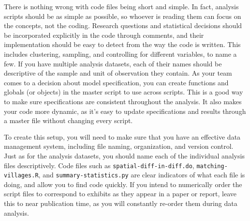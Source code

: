 \documentclass[
]{book}
\begin{document}
There is nothing wrong with code files being short and simple.
In fact, analysis scripts should be as simple as possible,
so whoever is reading them can focus on the concepts, not the coding.
Research questions and statistical decisions should be incorporated explicitly in the code through comments,
and their implementation should be easy to detect from the way the code is written.
This includes clustering, sampling, and controlling for different variables, to name a few.
If you have multiple analysis datasets,
each of their names should be descriptive of the sample and unit of observation they contain.
As your team comes to a decision about model specification,
you can create functions and globals (or objects) in the master script to use across scripts.
This is a good way to make sure specifications are consistent throughout the analysis.
It also makes your code more dynamic,
as it's easy to update specifications and results
through a master file without changing every script.

To create this setup,
you will need to make sure that you have an effective data management system,
including file naming, organization, and version control.
Just as for the analysis datasets,
you should name each of the individual analysis files descriptively.
Code files such as \texttt{spatial-diff-in-diff.do},
\texttt{matching-villages.R}, and \texttt{summary-statistics.py}
are clear indicators of what each file is doing, and allow you to find code quickly.
If you intend to numerically order the script files
to correspond to exhibits as they appear in a paper or report,
leave this to near publication time,
as you will constantly re-order them during data analysis.
\end{document}
